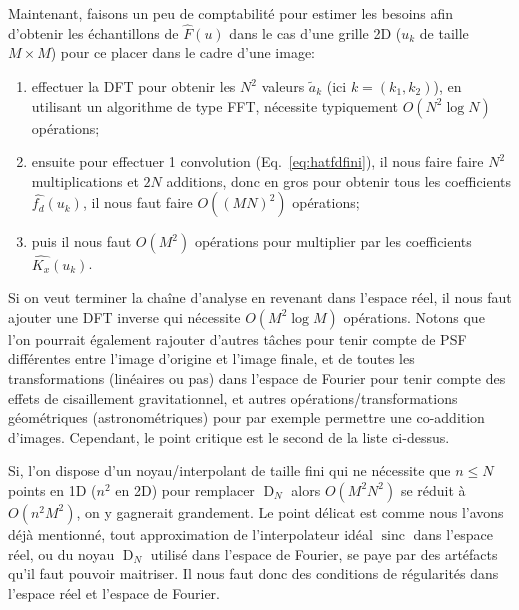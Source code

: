 \documentclass[11pt,twoside]{article}
\DeclareMathOperator{\sinc}{sinc}
\DeclareMathOperator{\D}{D}
\DeclareMathOperator{\comb}{\raisebox{\depth}{\rotatebox{270}{$\exists$}}}
\begin{document}

Maintenant, faisons un peu de comptabilité pour estimer les besoins afin d'obtenir les échantillons de $\hat{F}(u)$ dans le cas d'une grille 2D ($u_k$ de taille $M\times M$) pour  ce placer dans le cadre d'une image:
\begin{enumerate}
\item effectuer la DFT pour obtenir les $N^2$ valeurs $\tilde{a}_{k}$ (ici $k=(k_1,k_2)$), en utilisant un algorithme de type FFT, nécessite typiquement $O(N^2\log N)$ opérations;
\item ensuite pour effectuer 1 convolution (Eq.~\ref{eq:hatfdfini}), il nous faire faire $N^2$ multiplications et $2N$ additions, donc en gros pour obtenir tous les coefficients $\hat{f_d}(u_k)$, il nous faut faire $O((MN)^2)$ opérations;
\item puis il nous faut $O(M^2)$ opérations pour multiplier par les coefficients $\hat{K_x}(u_k)$.
\end{enumerate}
Si on veut terminer la chaîne d'analyse en revenant dans l'espace réel, il nous faut ajouter une DFT inverse qui nécessite $O(M^2\log M)$ opérations. Notons que l'on pourrait également rajouter d'autres tâches pour tenir compte de PSF différentes entre l'image d'origine et l'image finale, et de toutes les transformations (linéaires ou pas) dans l'espace de Fourier pour tenir compte des effets de cisaillement gravitationnel, et autres opérations/transformations géométriques (astronométriques) pour par exemple permettre une co-addition d'images. Cependant, le point critique est le second de la liste ci-dessus.

Si, l'on dispose d'un noyau/interpolant de taille fini qui ne nécessite que $n\leq N$ points en 1D ($n^2$ en 2D) pour remplacer $\D_N$ alors $O(M^2N^2)$ se réduit à $O(n^2 M^2)$, on y gagnerait grandement. Le point délicat est comme nous l'avons déjà mentionné, tout approximation de l'interpolateur idéal $\sinc$ dans l'espace réel, ou du noyau $\D_N$ utilisé dans l'espace de Fourier, se paye par des artéfacts qu'il faut pouvoir maitriser. Il nous faut donc des conditions de régularités dans l'espace réel et l'espace de Fourier. 
%
\end{document}
